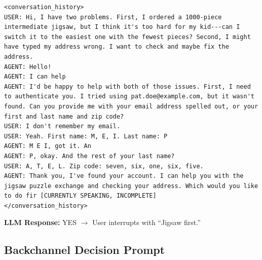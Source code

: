 \begin{lstlisting}
<conversation_history>
USER: Hi, I have two problems. First, I ordered a 1000-piece intermediate jigsaw, but I think it's too hard for my kid---can I switch it to the easiest one with the fewest pieces? Second, I might have typed my address wrong. I want to check and maybe fix the address.
AGENT: Hello!
AGENT: I can help
AGENT: I'd be happy to help with both of those issues. First, I need to authenticate you. I tried using pat.doe@example.com, but it wasn't found. Can you provide me with your email address spelled out, or your first and last name and zip code?
USER: I don't remember my email.
USER: Yeah. First name: M, E, I. Last name: P
AGENT: M E I, got it. An
AGENT: P, okay. And the rest of your last name?
USER: A, T, E, L. Zip code: seven, six, one, six, five.
AGENT: Thank you, I've found your account. I can help you with the jigsaw puzzle exchange and checking your address. Which would you like to do fir [CURRENTLY SPEAKING, INCOMPLETE]
</conversation_history>
\end{lstlisting}

\noindent\textbf{LLM Response:} YES $\rightarrow$ User interrupts with ``Jigsaw first.''

\subsection{Backchannel Decision Prompt}

